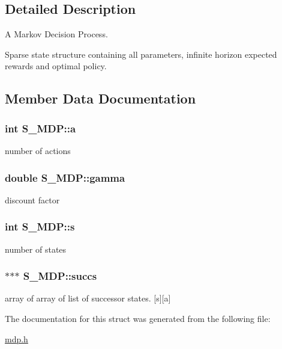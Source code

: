 \subsection{Detailed Description}
A Markov Decision Process. 

Sparse state structure containing all parameters, infinite horizon expected rewards and optimal policy. 

\subsection{Member Data Documentation}
\subsubsection[{\texorpdfstring{a}{a}}]{\setlength{\rightskip}{0pt plus 5cm}int S\+\_\+\+M\+D\+P\+::a}\hypertarget{structS__MDP_a512f18c9bed22b8a7e14be6e721499ec}{}\label{structS__MDP_a512f18c9bed22b8a7e14be6e721499ec}
number of actions 
\subsubsection[{\texorpdfstring{gamma}{gamma}}]{\setlength{\rightskip}{0pt plus 5cm}double S\+\_\+\+M\+D\+P\+::gamma}\hypertarget{structS__MDP_a973affe2889f433250f47b659609f100}{}\label{structS__MDP_a973affe2889f433250f47b659609f100}
discount factor 
\subsubsection[{\texorpdfstring{s}{s}}]{\setlength{\rightskip}{0pt plus 5cm}int S\+\_\+\+M\+D\+P\+::s}\hypertarget{structS__MDP_af679a2da7c40a40f980830cc2cbf6b77}{}\label{structS__MDP_af679a2da7c40a40f980830cc2cbf6b77}
number of states 
\subsubsection[{\texorpdfstring{succs}{succs}}]{$\ast$$\ast$$\ast$ S\+\_\+\+M\+D\+P\+::succs}\hypertarget{structS__MDP_abe58c0d8bf2759da0306273d7837f7a8}{}\label{structS__MDP_abe58c0d8bf2759da0306273d7837f7a8}
array of array of list of successor states. \mbox{[}s\mbox{]}\mbox{[}a\mbox{]} 

The documentation for this struct was generated from the following file\+:\begin{DoxyCompactItemize}
\item 
\hyperlink{mdp_8h}{mdp.\+h}\end{DoxyCompactItemize}
